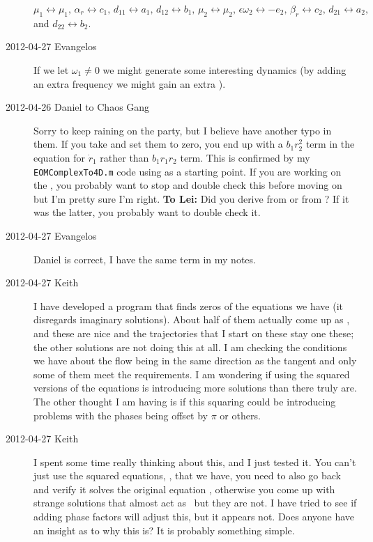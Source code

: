 \begin{description}
 $\mu_1 \leftrightarrow \mu_1,\, \alpha_r \leftrightarrow c_1,\, d_{11} \leftrightarrow a_1,\, d_{12} \leftrightarrow b_1,\, \mu_2 \leftrightarrow \mu_2,\, \epsilon \omega_2 \leftrightarrow -e_2,\, \beta_r \leftrightarrow c_2,\, d_{21} \leftrightarrow a_2,$ and  $d_{22} \leftrightarrow b_2$.

\item[2012-04-27 Evangelos] If we let $\omega_1\neq0$ we might generate
some interesting dynamics (by adding an extra frequency we might gain an
extra \reqv).

\item[2012-04-26 Daniel to Chaos Gang] Sorry to keep raining on the
party, but I believe  have another typo in
them. If you take  and set them to zero, you end
up with a $b_1 r_2^2$ term in the equation for $\dot{r}_1$ rather than
$b_1 r_1 r_2$ term. This is confirmed by my \texttt{EOMComplexTo4D.m}
code using  as a starting point. If you are
working on the {\twoMode} \reqva, you probably want to stop and
double check this before moving on but I'm pretty sure I'm right. {\bf To
Lei:} Did you derive  from 
or from ? If it was the latter, you probably
want to double check it.

\item[2012-04-27 Evangelos] Daniel is correct, I have the same term in my notes.

\item[2012-04-27 Keith]  I have developed a program that finds zeros of
the equations we have (it disregards imaginary solutions).  About half of
them actually come up as \reqva, and these are nice and
the trajectories that I start on these stay one these; the other
solutions are not doing this at all.  I am checking the conditions we
have about the flow being in the same direction as the tangent and only
some of them meet the requirements.  I am wondering if using the squared
versions of the equations is introducing more solutions than there truly
are.  The other thought I am having is if this squaring could be
introducing problems with the phases being offset by $\pi$ or others.


\item[2012-04-27 Keith]  I spent some time really thinking about this,
and I just tested it.  You can't just use the squared equations,
, that we have, you need to also go back and verify
it solves the original equation , otherwise you
come up with strange solutions that almost act as \reqva\
but they are not.  I have tried to see if adding phase factors will
adjust this, but it appears not.  Does anyone have an insight as to why
this is?  It is probably something simple.


\end{description}
